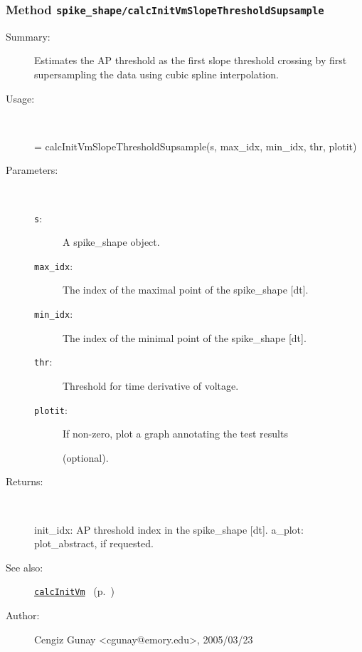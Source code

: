 \subsubsection[Method \texttt{calcInitVmSlopeThresholdSupsample}]{Method \texttt{spike\_shape/calcInitVmSlopeThresholdSupsample}}%
%
\label{ref_spike_shape__calcInitVmSlopeThresholdSupsample}%
\hypertarget{ref_spike_shape__calcInitVmSlopeThresholdSupsample}{}%
\begin{description}
\item[Summary:]Estimates the AP threshold as the first slope threshold crossing by first supersampling the data using cubic spline interpolation.
%
\item[Usage:]~%
\begin{lyxcode}%
[init\_idx, a\_plot] = calcInitVmSlopeThresholdSupsample(s, max\_idx, min\_idx, thr, plotit)
%
\end{lyxcode}%
%
%
\item[Parameters:]~
\begin{description}%
\item[\texttt{s}:]
 A spike\_shape object.
\item[\texttt{max\_idx}:]
 The index of the maximal point of the spike\_shape [dt].
\item[\texttt{min\_idx}:]
 The index of the minimal point of the spike\_shape [dt].
\item[\texttt{thr}:]
 Threshold for time derivative of voltage.
\item[\texttt{plotit}:]
 If non-zero, plot a graph annotating the test results 

(optional).
\end{description}%
%
\item[Returns:
]~

	init\_idx: AP threshold index in the spike\_shape [dt].
	a\_plot: plot\_abstract, if requested.
%
%
\item[See also:]%
\hyperlink{ref_calcInitVm}{\texttt{calcInitVm}}%
\ (p.~\pageref{ref_calcInitVm})%
%
%
\item[Author:]%
Cengiz Gunay <cgunay@emory.edu>, 2005/03/23
%
\end{description}
\methodline%
